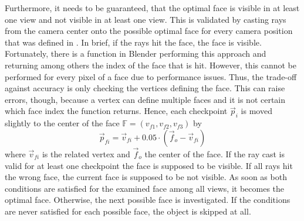 Furthermore, it needs to be guaranteed, that the optimal face is visible in at least one view and not visible in at least one view.
This is validated by casting rays from the camera center onto the possible optimal face for every camera position that was defined in .
In brief, if the rays hit the face, the face is visible.
Fortunately, there is a function in Blender performing this approach and returning among others the index of the face that is hit.
However, this cannot be performed for every pixel of a face due to performance issues.
Thus, the trade-off against accuracy is only checking the vertices defining the face.
This can raise errors, though, because a vertex can define multiple faces and it is not certain which face index the function returns.
Hence, each checkpoint $\vec{p}_i$ is moved slightly to the center of the face $\mathbb{F} = (v_{f1}, v_{f2}, v_{f3})$ by
\begin{equation}
	\vec{p}_{fi} = \vec{v}_{fi} + 0.05 \cdot (\vec{f}_o - \vec{v}_{fi})
\end{equation}
where $\vec{v}_{fi}$ is the related vertex and $\vec{f}_o$ the center of the face.
If the ray cast is valid for at least one checkpoint the face is supposed to be visible.
If all rays hit the wrong face, the current face is supposed to be not visible.
As soon as both conditions are satisfied for the examined face among all views, it becomes the optimal face.
Otherwise, the next possible face is investigated.
If the conditions are never satisfied for each possible face, the object is skipped at all.

